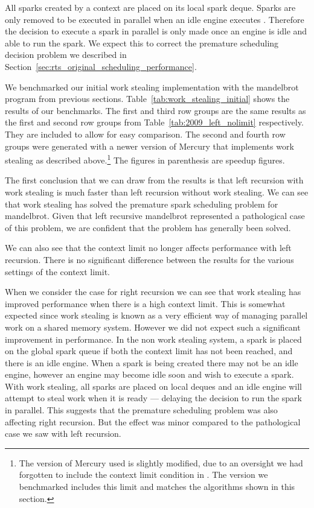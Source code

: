 All sparks created by a context are placed on its local spark deque.
Sparks are only removed to be executed in parallel when an idle engine
executes \trystealspark.
Therefore
the decision to execute a spark in parallel is only made once an engine is
idle and able to run the spark.
We expect this to correct the premature scheduling decision problem we
described in Section~\ref{sec:rts_original_scheduling_performance}.



We benchmarked our initial work stealing implementation with the mandelbrot
program from previous sections.
Table~\ref{tab:work_stealing_initial} shows the results of our benchmarks.
The first and third row groups are the same results as the first and second
row groups from Table~\ref{tab:2009_left_nolimit} respectively.
They are included to allow for easy comparison.
The second and fourth row groups were generated with a newer version of
Mercury that implements work stealing as described above.\footnote{
    The version of Mercury used is slightly modified,
    due to an oversight we had forgotten to include the context limit
    condition in \idle.
    The version we benchmarked includes this limit and matches the
    algorithms shown in this section.}
The figures in parenthesis are speedup figures.

The first conclusion that we can draw from the results is that
left recursion with work stealing is much faster than left recursion without
work stealing.
We can see that work stealing has solved the premature spark scheduling problem
for mandelbrot.
Given that left recursive mandelbrot represented a pathological case of this
problem,
we are confident that the problem has generally been solved.

We can also see that the context limit no longer affects performance
with left recursion.
There is no significant difference between the results for the various
settings of the context limit.

When we consider the case for right recursion we can see that
work stealing has improved performance when there is a
high context limit.
This is somewhat expected since work stealing is known as a very
efficient way of managing parallel work on a shared memory system.
However we did not expect such a significant improvement in
performance.
In the non work stealing system,
a spark is placed on the global spark queue if both the context limit has
not been reached,
and there is an idle engine.
When a spark is being created there may not be an idle engine,
however an engine may become idle soon and wish to execute a spark.
With work stealing,
all sparks are placed on local deques and an idle
engine will attempt to steal work when it is ready ---
delaying the decision to run the spark in parallel.
This suggests that the premature scheduling problem was also affecting right
recursion.
But the effect was minor compared to the pathological case we saw with left
recursion.

